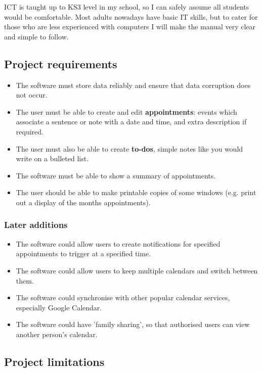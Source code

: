 ICT is taught up to KS3 level in my school, so I can safely assume all students
would be comfortable. Most adults nowadays have basic IT skills, but to cater
for those who are less experienced with computers I will make the manual very
clear and simple to follow.


\subsection{Project requirements}

\begin{itemize}
    \item The software must store data reliably and ensure that data corruption
        does not occur.
    \item The user must be able to create and edit \textbf{appointments}: events
        which associate a sentence or note with a date and time, and extra
        description if required.
    \item The user must also be able to create \textbf{to-dos}, simple notes
        like you would write on a bulleted list.
    \item The software must be able to show a summary of appointments.
    \item The user should be able to make printable copies of some windows (e.g.
        print out a display of the months appointments).
\end{itemize}

\subsubsection{Later additions}
\begin{itemize}
    \item The software could allow users to create notifications for specified
        appointments to trigger at a specified time.
    \item The software could allow users to keep multiple calendars and switch
        between them.
    \item The software could synchronise with other popular calendar services,
        especially Google Calendar.
    \item The software could have 'family sharing', so that authorised users can
        view another person's calendar.
\end{itemize}


\subsection{Project limitations}

